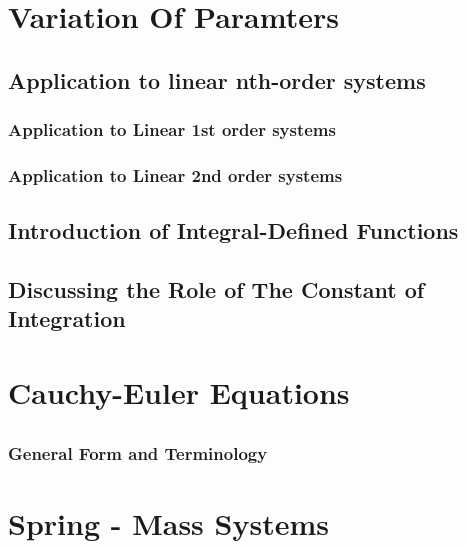 \documentclass[10pt]{article}
\begin{document}
\section{Variation Of Paramters}

\subsection{Application to linear nth-order systems }

    \subsubsection{Application to Linear 1st order systems}
    \subsubsection{Application to Linear 2nd order systems}
\subsection{Introduction of Integral-Defined Functions}
\subsection{Discussing the Role of The Constant of Integration}

\section{Cauchy-Euler Equations}

\subsection{ }

    \subsubsection{General Form and Terminology}


\section{Spring - Mass Systems}
\end{document}
